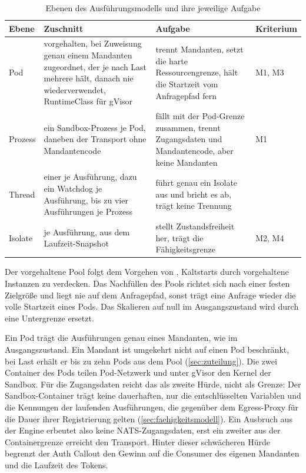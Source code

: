 \begin{table}[H]
\centering
\caption{Ebenen des Ausführungsmodells und ihre jeweilige Aufgabe}
\label{tab:ebenen}
\small
\renewcommand{\arraystretch}{1.1}
\begin{tabularx}{\textwidth}{@{}>{\RaggedRight\arraybackslash}p{}
  >{\RaggedRight\arraybackslash\hsize=1.08\hsize}X
  >{\RaggedRight\arraybackslash\hsize=0.92\hsize}X
  >{\centering\arraybackslash}p{}@{}}
  \hline
  Ebene & Zuschnitt & Aufgabe & Kriterium \\
  \hline
  Pod & vorgehalten, bei Zuweisung genau einem Mandanten zugeordnet, der je nach Last mehrere
    hält, danach nie wiederverwendet,
    RuntimeClass für gVisor &
    trennt Mandanten, setzt die harte Ressourcengrenze, hält die Startzeit vom Anfragepfad
    fern & M1, M3 \\[0.6ex]
  Prozess & ein Sandbox-Prozess je Pod, daneben der Transport ohne Mandantencode &
    fällt mit der Pod-Grenze zusammen, trennt Zugangsdaten und Mandantencode, aber keine
    Mandanten & M1 \\[0.6ex]
  Thread & einer je Ausführung, dazu ein Watchdog je Ausführung, bis zu vier Ausführungen je
    Prozess &
    führt genau ein Isolate aus und bricht es ab, trägt keine Trennung & \\[0.6ex]
  Isolate & je Ausführung, aus dem Laufzeit-Snapshot &
    stellt Zustandsfreiheit her, trägt die Fähigkeitsgrenze & M2, M4 \\
  \hline
\end{tabularx}
\end{table}


Der vorgehaltene Pool folgt dem Vorgehen von \textcite[S.~1]{lin_mitigating_2019}, Kaltstarts durch vorgehaltene
Instanzen zu verdecken. Das Nachfüllen des Pools richtet sich nach einer festen Zielgröße und liegt nie auf dem
Anfragepfad, sonst trägt eine Anfrage wieder die volle Startzeit eines Pods. Das Skalieren auf null im
Ausgangszustand \autocite{the_knative_authors_configuring_2026} wird durch eine Untergrenze ersetzt.

Ein Pod trägt die Ausführungen genau eines Mandanten, wie im Ausgangszustand. Ein Mandant ist umgekehrt nicht auf
einen Pod beschränkt, bei Last erhält er bis zu zehn Pods aus dem Pool (\autoref{sec:zuteilung}). Die zwei Container
des Pods teilen Pod-Netzwerk und unter gVisor den Kernel der Sandbox. Für die Zugangsdaten reicht das als zweite Hürde, nicht als
Grenze: Der Sandbox-Container trägt keine dauerhaften, nur die entschlüsselten Variablen und die Kennungen der laufenden Ausführungen, die gegenüber dem
Egress-Proxy für die Dauer ihrer Registrierung gelten (\autoref{sec:faehigkeitsmodell}). Ein Ausbruch aus der Engine
erbeutet also keine NATS-Zugangsdaten, erst ein zweiter aus der Containergrenze erreicht den Transport. Hinter dieser schwächeren Hürde begrenzt der Auth Callout den Gewinn auf die
Consumer des eigenen Mandanten und die Laufzeit des Tokens.

